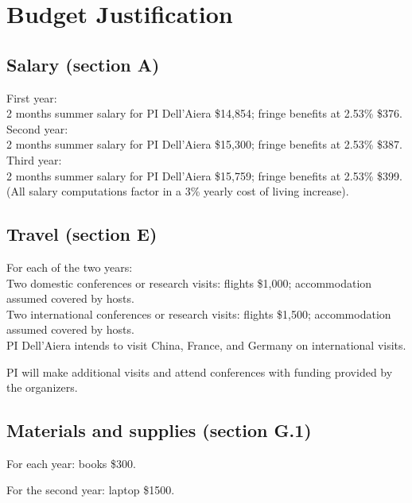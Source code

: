 \documentclass[11pt]{article}
\begin{document}
\section*{Budget Justification}

\subsection*{Salary (section A)}

\noindent  First year:\\
2 months summer salary for PI Dell'Aiera \$14,854; fringe benefits at 2.53\% \$376.\\

\noindent  Second year:\\
2 months summer salary for PI Dell'Aiera \$15,300; fringe benefits at 2.53\% \$387.\\

\noindent Third year:\\
2 months summer salary for PI Dell'Aiera \$15,759; fringe benefits at 2.53\% \$399.\\

\noindent (All salary computations factor in a 3\% yearly cost of living increase).

\subsection*{Travel (section E)}

For each of the two years:\\

\noindent Two domestic conferences or research visits: flights \$1,000; accommodation assumed covered by hosts.\\  

\noindent Two international conferences or research visits: flights \$1,500; accommodation assumed covered by hosts.\\ 

\noindent PI Dell'Aiera intends to visit China, France, and Germany on international visits.

\noindent PI will make additional visits and attend conferences with funding provided by the organizers.

\subsection*{Materials and supplies (section G.1)}

For each year: books \$300.

\noindent For the second year: laptop \$1500.
\end{document}
